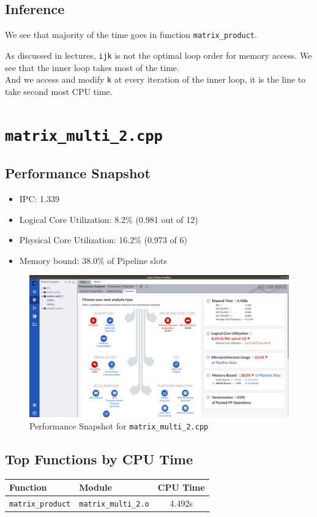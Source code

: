 \documentclass[11pt, swedish, openany]{book}
\begin{document}
\subsection*{Inference}
We see that majority of the time goes in function \texttt{matrix\_product}.

As discussed in lectures, \texttt{ijk} is not the optimal loop order for memory access. We see that the inner loop takes most of the time. \\
And we access and modify \texttt{k} at every iteration of the inner loop, it is the line to take second most CPU time.


\newpage
\section{\texttt{matrix\_multi\_2.cpp}}

\subsection*{Performance Snapshot}
\begin{itemize}
    \item IPC: 1.339
    \item Logical Core Utilization: 8.2\% (0.981 out of 12)
    \item Physical Core Utilization: 16.2\% (0.973 of 6)
    \item Memory bound: 38.0\% of Pipeline slots
\end{itemize}

\begin{figure}[H]
    \centering
    \includegraphics[scale=0.25]{vtune/matrix_multi_2/ps.png}
    \caption{Performance Snapshot for \texttt{matrix\_multi\_2.cpp}}
\end{figure}

\newpage
\subsection*{Top Functions by CPU Time}
\begin{table}[H]
    \begin{tabular}{||l|l||c||}
        \hline
        Function                 & Module                      & CPU Time \\
        \hline
        \texttt{matrix\_product} & \texttt{matrix\_multi\_2.o} & 4.492s   \\
        \hline
    \end{tabular}
\end{table}
\end{document}
